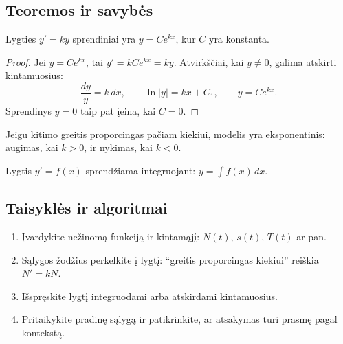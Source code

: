 \subsection{Teoremos ir savybės}
\begin{teorema}
Lygties \(y'=ky\) sprendiniai yra \(y=Ce^{kx}\), kur \(C\) yra konstanta.
\end{teorema}
\begin{proof}
Jei \(y=Ce^{kx}\), tai \(y'=kCe^{kx}=ky\). Atvirkščiai, kai \(y\ne0\), galima atskirti kintamuosius:
\[
\frac{dy}{y}=k\,dx,\qquad \ln|y|=kx+C_1,\qquad y=Ce^{kx}.
\]
Sprendinys \(y=0\) taip pat įeina, kai \(C=0\).
\end{proof}
\begin{savybe}
Jeigu kitimo greitis proporcingas pačiam kiekiui, modelis yra eksponentinis: augimas, kai \(k>0\), ir nykimas, kai \(k<0\).
\end{savybe}
\begin{savybe}
Lygtis \(y'=f(x)\) sprendžiama integruojant: \(y=\int f(x)\,dx\).
\end{savybe}

\subsection{Taisyklės ir algoritmai}
\begin{enumerate}[label=\arabic*.]
\item Įvardykite nežinomą funkciją ir kintamąjį: \(N(t)\), \(s(t)\), \(T(t)\) ar pan.
\item Sąlygos žodžius perkelkite į lygtį: ``greitis proporcingas kiekiui'' reiškia \(N'=kN\).
\item Išspręskite lygtį integruodami arba atskirdami kintamuosius.
\item Pritaikykite pradinę sąlygą ir patikrinkite, ar atsakymas turi prasmę pagal kontekstą.
\end{enumerate}

